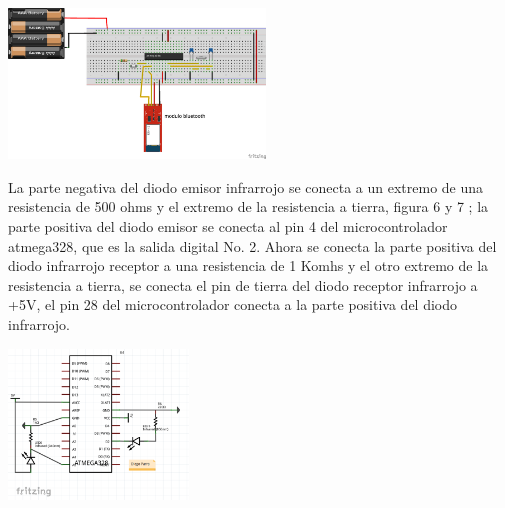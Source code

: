 \documentclass[12pt]{article}
\newenvironment{Figure}
{\par\medskip\noindent\minipage{\linewidth}}
{\endminipage\par\medskip}
\begin{document}
\begin{multicols}{2}
\begin{Figure}
\center
\includegraphics[width=7.cm, height=4cm]{fig/bluetoothmon.png}
\label{fig:g5}
\end{Figure}

La parte negativa del diodo  emisor infrarrojo se conecta a un extremo de una resistencia de 500 ohms y el extremo de la resistencia a tierra, figura 6 y 7 ; la parte positiva del diodo emisor se conecta al pin 4 del microcontrolador atmega328, que es la salida digital No. 2. Ahora se conecta la parte positiva del diodo infrarrojo receptor a una resistencia de 1 Komhs y el otro extremo de la resistencia a tierra, se conecta el pin de tierra del diodo receptor infrarrojo a +5V, el pin 28 del microcontrolador conecta a la parte positiva del diodo infrarrojo. 

\begin{Figure}
\center
\includegraphics[width=7.cm, height=4cm]{fig/s_esquema.png}
\label{fig:g6}
\end{Figure}


\end{multicols}
\end{document}
